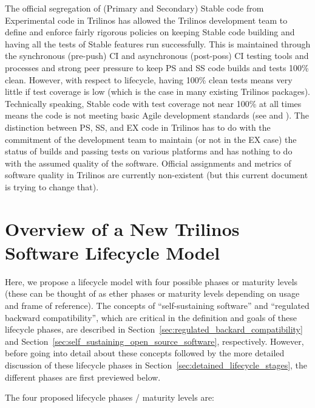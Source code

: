 \documentclass[11pt]{SANDreport}
\begin{document}
The official segregation of (Primary and Secondary) Stable code from
Experimental code in Trilinos has allowed the Trilinos development
team to define and enforce fairly rigorous policies on keeping Stable
code building and having all the tests of Stable features run
successfully.  This is maintained through the synchronous (pre-push)
CI and asynchronous (post-poss) CI testing tools and processes and
strong peer pressure to keep PS and SS code builds and tests 100\%
clean.  However, with respect to lifecycle, having 100\% clean tests
means very little if test coverage is low (which is the case in many
existing Trilinos packages).  Technically speaking, Stable code with
test coverage not near 100\% at all times means the code is not
meeting basic Agile development standards (see {}\cite{XP2} and
{}\cite{CodeComplete2nd04}).  The distinction between PS, SS, and EX
code in Trilinos has to do with the commitment of the development team
to maintain (or not in the EX case) the status of builds and passing
tests on various platforms and has nothing to do with the assumed
quality of the software.  Official assignments and metrics of software
quality in Trilinos are currently non-existent (but this current
document is trying to change that).


%
{}\section{Overview of a New Trilinos Software Lifecycle Model}
\label{sec:life_cycle_overview}
%

Here, we propose a lifecycle model with four possible phases or
maturity levels (these can be thought of as ether phases or maturity
levels depending on usage and frame of reference).  The concepts of
``self-sustaining software'' and ``regulated backward compatibility'',
which are critical in the definition and goals of these lifecycle
phases, are described in
Section~\ref{sec:regulated_backard_compatibility} and
Section~\ref{sec:self_sustaining_open_source_software}, respectively.
However, before going into detail about these concepts followed by the
more detailed discussion of these lifecycle phases in
Section~\ref{sec:detained_lifecycle_stages}, the different phases are
first previewed below.

The four proposed lifecycle phases / maturity levels are:
\end{document}
